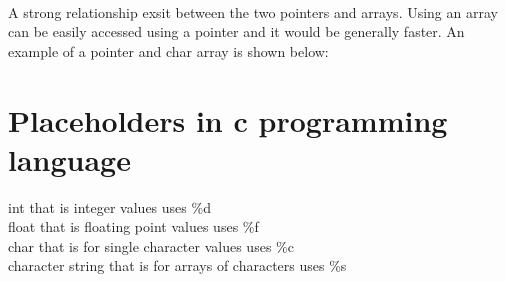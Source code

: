 \documentclass{article}
\begin{document}
	\paragraph{}
	A strong relationship exsit between the two pointers and arrays. Using an array can be easily accessed using a pointer and it would be generally faster. An example of a pointer and char array is shown below:
	
	
	\section{Placeholders in c programming language}
	int that is integer values uses \%d
	\\float that is floating point values uses \%f
	\\char that is for single character values uses \%c
	\\character string that is for arrays of characters uses \%s
	
\end{document}
